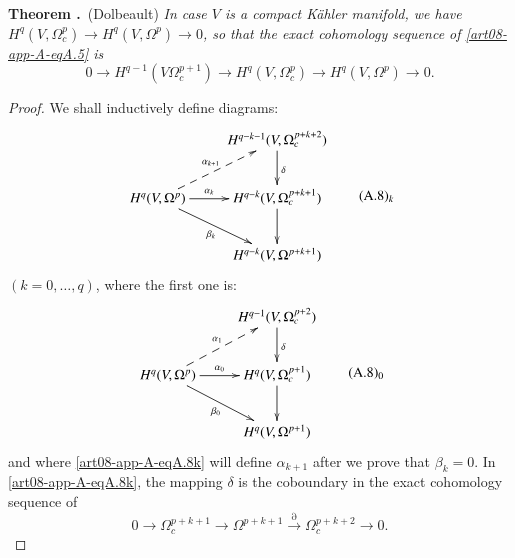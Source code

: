\medskip
\noindent
{\bf Theorem .\label{art08-app-A-thmA.6}}~(Dolbeault)
{\em In case $V$ is a compact K\"ahler manifold, we have $H^{q}(V,\Omega^{p}_{c})\to H^{q}(V,\Omega^{p})\to 0$, so that the exact cohomology sequence of \eqref{art08-app-A-eqA.5} is}
\begin{equation*}
0\to H^{q-1}(V\Omega^{p+1}_{c})\to H^{q}(V,\Omega^{p}_{c})\to H^{q}(V,\Omega^{p})\to 0.\tag{A.7}\label{art08-app-A-eqA.7}
\end{equation*}

\begin{proof}
We shall inductively define diagrams:
\begin{equation*}
\vcenter{\xymatrix{
 & H^{q-k-1}(V,\Omega^{p+k+2}_{c})\ar[d]^{\delta}\\
H^{q}(V,\Omega^{p})\ar[r]^-{\alpha_{k}}\ar@{-->}[ur]^-{\alpha_{k+1}}\ar[dr]_-{\beta_{k}} & H^{q-k}(V,\Omega^{p+k+1}_{c})\ar[d]\\
 & H^{q-k}(V,\Omega^{p+k+1})
}}\tag*{(A.8)$_{k}$}\label{art08-app-A-eqA.8k}
\end{equation*}
$(k=0,\ldots,q)$, where the first one is:
\begin{equation*}
\vcenter{\xymatrix{
 & H^{q-1}(V,\Omega^{p+2}_{c})\ar[d]^{\delta}\\
H^{q}(V,\Omega^{p})\ar[r]^-{\alpha_{0}}\ar@{-->}[ur]^-{\alpha_{1}}\ar[dr]_-{\beta_{0}} & H^{q}(V,\Omega^{p+1}_{c})\ar[d]\\
 & H^{q}(V,\Omega^{p+1})
}}\tag*{(A.8)$_{0}$}\label{art08-app-A-eqA.8-0}
\end{equation*}\pageoriginale
and where \ref{art08-app-A-eqA.8k} will define $\alpha_{k+1}$ after we prove that $\beta_{k}=0$. In \ref{art08-app-A-eqA.8k}, the mapping $\delta$ is the coboundary in the exact cohomology sequence of
$$
0\to \Omega^{p+k+1}_{c}\to \Omega^{p+k+1}\xrightarrow{\partial}\Omega_{c}^{p+k+2}\to 0.
$$


\end{proof}
